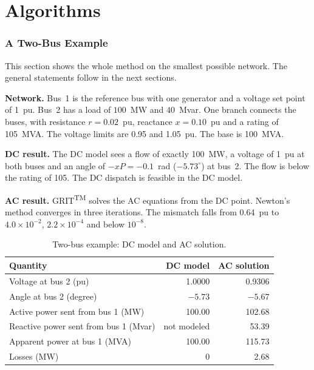 \documentclass[a4paper,11pt]{article}
\newcommand{\TM}{\textsuperscript{TM}}
\newcommand{\GRIT}{GRIT\TM}
\begin{document}
\part{Algorithms}\label{part:algorithms}

\clearpage
\section{A Two-Bus Example}\label{sec:twobus}

This section shows the whole method on the smallest possible network. The general statements follow in the next sections.

\textbf{Network.} Bus~1 is the reference bus with one generator and a voltage set point of 1~pu. Bus~2 has a load of $100$~MW and $40$~Mvar. One branch connects the buses, with resistance $r=0.02$~pu, reactance $x=0.10$~pu and a rating of 105~MVA. The voltage limits are 0.95 and 1.05~pu. The base is 100~MVA.

\textbf{DC result.} The DC model sees a flow of exactly 100~MW, a voltage of 1~pu at both buses and an angle of $-x P = -0.1$~rad ($-5.73^\circ$) at bus~2. The flow is below the rating of 105. The DC dispatch is feasible in the DC model.

\textbf{AC result.} \GRIT{} solves the AC equations from the DC point. Newton's method converges in three iterations. The mismatch falls from 0.64~pu to $4.0\times10^{-2}$, $2.2\times10^{-4}$ and below $10^{-8}$.

\begin{table}[H]\centering
\begin{tabular}{@{}lrr@{}}
\toprule
\textbf{Quantity} & \textbf{DC model} & \textbf{AC solution} \\
\midrule
Voltage at bus 2 (pu) & 1.0000 & 0.9306 \\
Angle at bus 2 (degree) & $-5.73$ & $-5.67$ \\
Active power sent from bus 1 (MW) & 100.00 & 102.68 \\
Reactive power sent from bus 1 (Mvar) & not modeled & 53.39 \\
Apparent power at bus 1 (MVA) & 100.00 & 115.73 \\
Losses (MW) & 0 & 2.68 \\
\bottomrule
\end{tabular}
\caption{Two-bus example: DC model and AC solution.}
\end{table}
\end{document}
